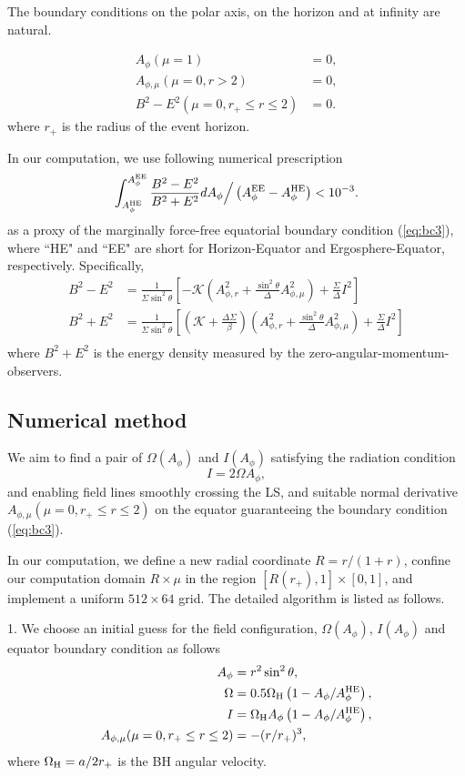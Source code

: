 \documentclass[aps,prd,reprint,nofootinbib, superscriptaddress]{revtex4-1}
\def\sst{\sin^2\theta}
\def\Ap{A_\phi}
\def\Ar{A_{\phi,r}}
\def\Am{A_{\phi,\mu}}
\def\be{\begin{equation}}
\def\ee{\end{equation}}
\def\WH{\Omega_{\rm H}}
\def\AHE{A_\phi^{\rm HE}}
\begin{document}
The boundary conditions on the polar axis, on the horizon and at infinity are natural.

\begin{subequations}
\begin{align}
    A_\phi(\mu = 1) &= 0,  \label{eq:bc1}\\
    \Am(\mu = 0, r > 2) &= 0, \label{eq:bc2}\\
    B^2-E^2 (\mu = 0, r_+ \leq r \leq 2) &=0.\label{eq:bc3}
\end{align}
\end{subequations}
where $r_+$ is the radius of the event horizon.

In our computation, we use following numerical prescription
\be
\label{eq:nbc}
\int_{A_\phi^{\rm HE}}^{A_\phi^{\rm EE}} \frac{B^2-E^2}{B^2+E^2} dA_\phi \Big/ \left(A_\phi^{\rm EE}- A_\phi^{\rm HE}\right)  < 10^{-3}.
\ee
as a proxy of the marginally force-free equatorial boundary condition (\ref{eq:bc3}),
where ``HE" and ``EE" are short for Horizon-Equator and Ergosphere-Equator, respectively.
Specifically,
\be
\begin{aligned}
B^2-E^2 &= \frac{1}{\Sigma \sst} \left[ -\mathcal{K} \left(\Ar^2 +\frac{\sst}{\Delta}\Am^2 \right)+\frac{\Sigma}{\Delta}I^2\right]\\
B^2+E^2 &= \frac{1}{\Sigma \sst} \left[ \left(\mathcal{K}+\frac{\Delta\Sigma}{\beta} \right) \left(\Ar^2 +\frac{\sst}{\Delta}\Am^2 \right)+\frac{\Sigma}{\Delta}I^2\right]\\
\end{aligned}
\ee
where $B^2+E^2$ is the energy density measured by the zero-angular-momentum-observers.

\subsection{Numerical method}
We aim to find a pair of $\Omega(A_\phi)$ and $I(A_\phi)$ satisfying the radiation condition
\be I = 2\Omega A_\phi, \label{eq:rad}\ee
and enabling field lines smoothly crossing the LS,
and suitable normal derivative $\Am(\mu =0, r_+\leq r \leq 2)$ on the equator
guaranteeing the boundary condition (\ref{eq:bc3}).

In our computation, we define a new radial coordinate $R=r/(1+r)$, confine our
computation domain $R\times \mu$ in the region $[R(r_+), 1]\times [0,1]$,
and implement a uniform $512\times 64$ grid. The detailed algorithm is listed as follows.

1. We choose an initial guess for the field configuration, $\Omega(\Ap)$, $I(\Ap)$
and equator boundary condition as follows
\begin{subequations}
\begin{align}
    \Ap &= r^2 \sst,  \label{eq:gss1} \\
    \Omega & = 0.5\WH\left(1-\Ap/\AHE\right),  \label{eq:gss2}\\
    I & = \WH \Ap\left(1-\Ap/\AHE\right) , \\
    \Am(\mu =0, r_+\leq r \leq 2) & = - (r/r_+)^3, \label{eq:gss3}
\end{align}
\end{subequations}
where $\WH = a/2r_+$ is the BH angular velocity.
\end{document}

